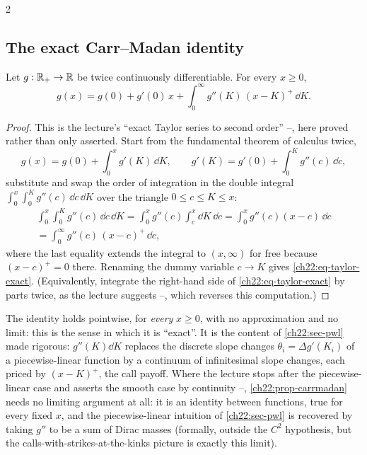 \begin{paracol}{2}
\subsection{The exact Carr--Madan identity}\label{ch22:sec-taylor}
\begin{proposition}\label{ch22:prop-carrmadan}
Let $g:\mathbb{R}_+\to\mathbb{R}$ be twice continuously differentiable. For every $x\ge0$,
\begin{equation}\label{ch22:eq-taylor-exact}
  g(x) = g(0) + g'(0)\,x + \int_0^\infty g''(K)\,(x-K)^+\,\dd K.
\end{equation}
\end{proposition}
\begin{proof}
This is the lecture's ``exact Taylor series to second order'' --,
here proved rather than only asserted. Start from the fundamental theorem of calculus twice,
\[
  g(x) = g(0) + \int_0^x g'(K)\,\dd K, \qquad g'(K) = g'(0) + \int_0^K g''(c)\,\dd c,
\]
substitute and swap the order of integration in the double integral
$\int_0^x\!\int_0^K g''(c)\,\dd c\,\dd K$ over the triangle $0\le c\le K\le x$:
\[
  \begin{gathered}
  \int_0^x\int_0^K g''(c)\,\dd c\,\dd K = \int_0^x g''(c)\int_c^x \dd K\,\dd c = \int_0^x g''(c)(x-c)\,\dd c \\
  = \int_0^\infty g''(c)\,(x-c)^+\,\dd c,
  \end{gathered}
\]
where the last equality extends the integral to $(x,\infty)$ for free because $(x-c)^+=0$ there. Renaming
the dummy variable $c\to K$ gives \eqref{ch22:eq-taylor-exact}. (Equivalently, integrate the right-hand
side of \eqref{ch22:eq-taylor-exact} by parts twice, as the lecture suggests
--, which reverses this computation.)
\end{proof}

\begin{remark}
The identity holds pointwise, for \emph{every} $x\ge0$, with no approximation and no limit: this is the
sense in which it is ``exact''. It is the content of \cref{ch22:sec-pwl} made rigorous:
$g''(K)\dd K$ replaces the discrete slope changes $\theta_i=\Delta g'(K_i)$ of a piecewise-linear
function by a continuum of infinitesimal slope changes, each priced by $(x-K)^+$, the call payoff.
Where the lecture stops after the piecewise-linear case and asserts the smooth case by continuity
--, \cref{ch22:prop-carrmadan} needs no limiting argument at
all: it is an identity between functions, true for every fixed $x$, and the piecewise-linear intuition
of \cref{ch22:sec-pwl} is recovered by taking $g''$ to be a sum of Dirac masses (formally, outside the
$C^2$ hypothesis, but the calls-with-strikes-at-the-kinks picture is exactly this limit).
\end{remark}


\end{paracol}
